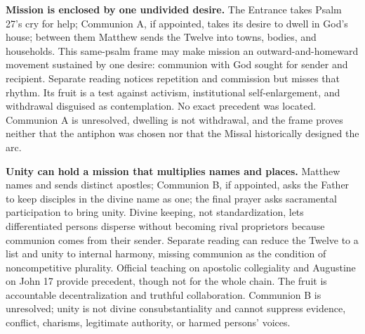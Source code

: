 \noindent\textbf{Mission is enclosed by one undivided desire.\enspace{}}
The Entrance takes Psalm 27's cry for help; Communion A, if appointed, takes its desire to dwell in God's house; between them Matthew sends the Twelve into towns, bodies, and households. This same-psalm frame may make mission an outward-and-homeward movement sustained by one desire: communion with God sought for sender and recipient. Separate reading notices repetition and commission but misses that rhythm. Its fruit is a test against activism, institutional self-enlargement, and withdrawal disguised as contemplation. No exact precedent was located. Communion A is unresolved, dwelling is not withdrawal, and the frame proves neither that the antiphon was chosen nor that the Missal historically designed the arc.

\noindent\textbf{Unity can hold a mission that multiplies names and places.\enspace{}}
Matthew names and sends distinct apostles; Communion B, if appointed, asks the Father to keep disciples in the divine name as one; the final prayer asks sacramental participation to bring unity. Divine keeping, not standardization, lets differentiated persons disperse without becoming rival proprietors because communion comes from their sender. Separate reading can reduce the Twelve to a list and unity to internal harmony, missing communion as the condition of noncompetitive plurality. Official teaching on apostolic collegiality and Augustine on John 17 provide precedent, though not for the whole chain. The fruit is accountable decentralization and truthful collaboration. Communion B is unresolved; unity is not divine consubstantiality and cannot suppress evidence, conflict, charisms, legitimate authority, or harmed persons' voices.
